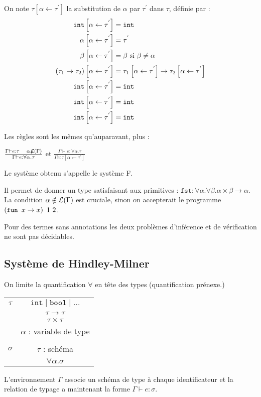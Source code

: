 \documentclass{cours}
\begin{document}
\begin{definition}
    On note $\tau\left[\alpha \leftarrow \tau^{'}\right]$ la substitution de $\alpha$ par $\tau^{'}$ dans $\tau$, définie par : 
    \[
        \begin{aligned}
            \texttt{int}\left[\alpha \leftarrow \tau^{'}\right] &= \texttt{int}\\
            \alpha\left[\alpha \leftarrow \tau^{'}\right] &= \tau^{'}\\
            \beta\left[\alpha \leftarrow \tau^{'}\right] &= \beta \text{ si } \beta \neq \alpha\\
            \left(\tau_{1} \rightarrow \tau_{2}\right)\left[\alpha \leftarrow \tau^{'}\right] &= \tau_{1}\left[\alpha \leftarrow \tau^{'}\right] \rightarrow \tau_{2}\left[\alpha \leftarrow \tau^{'}\right]\\
            \texttt{int}\left[\alpha \leftarrow \tau^{'}\right] &= \texttt{int}\\
            \texttt{int}\left[\alpha \leftarrow \tau^{'}\right] &= \texttt{int}\\
            \texttt{int}\left[\alpha \leftarrow \tau^{'}\right] &= \texttt{int}\\
        \end{aligned}    
    \]
\end{definition}

Les règles sont les mêmes qu'auparavant, plus : 
\begin{center}
    $\frac{\Gamma \vdash e : \tau \ \ \ \alpha \not \mathcal{L}(\Gamma)}{\Gamma \vdash e : \forall\alpha.\tau}$ et
    $\frac{\Gamma \vdash e : \forall\alpha.\tau}{\Gamma e : \tau\left[\alpha \leftarrow \tau^{'}\right]}$
\end{center}
Le système obtenu s'appelle le système F.

Il permet de donner un type satisfaisant aux primitives : $\texttt{fst} : \forall\alpha.\forall\beta.\alpha\times\beta \rightarrow \alpha$.
La condition $\alpha \notin \mathcal{L}(\Gamma)$ est cruciale, sinon on accepterait le programme $\left(\texttt{fun } x \rightarrow x\right)\ 1 \ 2$.

Pour des termes sans annotations les deux problèmes d'inférence et de vérification ne sont pas décidables.

\subsection{Système de Hindley-Milner}
On limite la quantification $\forall$ en tête des types (quantification prénexe.)
\begin{tabular}{c@{$\mid$}c}
    $\tau$ & $\texttt{int} \mid \texttt{bool} \mid \ldots$\\
    & $\tau \rightarrow \tau$\\
    &$\tau \times \tau$ \\
    & $\alpha$ : variable de type\\
    &\\
    $\sigma$ & $\tau$ : schéma\\
    & $\forall\alpha.\sigma$
\end{tabular}
L'environnement $\Gamma$ associe un schéma de type à chaque identificateur et la relation de typage a maintenant la forme $\Gamma \vdash e : \sigma$.
\end{document}
